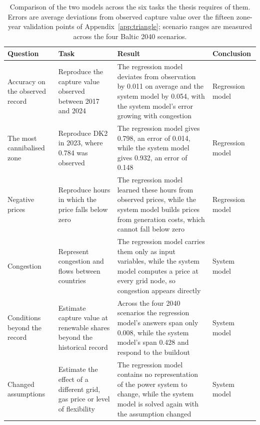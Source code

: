 \begin{table}[!htb]
\centering\small
\setlength{\tabcolsep}{4pt}
\caption{Comparison of the two models across the six tasks the thesis requires
of them. Errors are average deviations from observed capture value over the
fifteen zone-year validation points of Appendix~\ref{app:triangle}; scenario
ranges are measured across the four Baltic 2040 scenarios.}
\label{tab:model_verdict}
\begin{tabular}{>{\raggedright\arraybackslash}p{2.2cm}
                >{\raggedright\arraybackslash}p{3.2cm}
                >{\raggedright\arraybackslash}p{6.9cm}
                >{\raggedright\arraybackslash}p{1.9cm}}
\toprule
\textbf{Question} & \textbf{Task} & \textbf{Result} & \textbf{Conclusion} \\
\midrule
Accuracy on the observed record &
Reproduce the capture value observed between 2017 and 2024 &
The regression model deviates from observation by 0.011 on average and the
system model by 0.054, with the system model's error growing with congestion &
Regression model \\
\addlinespace
The most cannibalised zone &
Reproduce DK2 in 2023, where 0.784 was observed &
The regression model gives 0.798, an error of 0.014, while the system model
gives 0.932, an error of 0.148 &
Regression model \\
\addlinespace
Negative prices &
Reproduce hours in which the price falls below zero &
The regression model learned these hours from observed prices, while the
system model builds prices from generation costs, which cannot fall below
zero &
Regression model \\
\addlinespace
Congestion &
Represent congestion and flows between countries &
The regression model carries them only as input variables, while the system
model computes a price at every grid node, so congestion appears directly &
System model \\
\addlinespace
Conditions beyond the record &
Estimate capture value at renewable shares beyond the historical record &
Across the four 2040 scenarios the regression model's answers span only 0.008,
while the system model's span 0.428 and respond to the buildout &
System model \\
\addlinespace
Changed assumptions &
Estimate the effect of a different grid, gas price or level of flexibility &
The regression model contains no representation of the power system to change,
while the system model is solved again with the assumption changed &
System model \\
\bottomrule
\end{tabular}
\end{table}
\FloatBarrier
